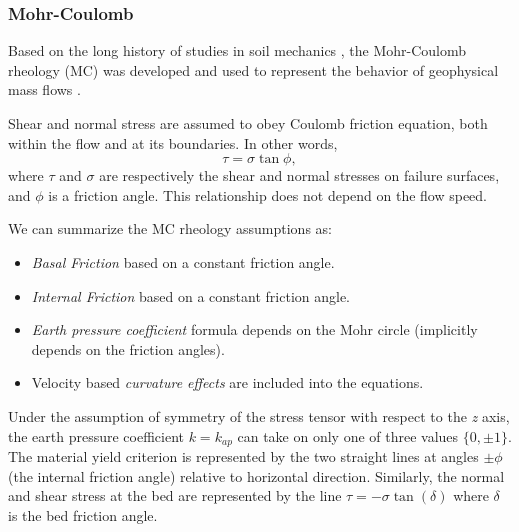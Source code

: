 \documentclass{article}
\begin{document}
\subsubsection{Mohr-Coulomb}\label{MCM}
Based on the long history of studies in soil mechanics \citep{Rankine1857,DruckerPage52}, the Mohr-Coulomb rheology (MC) was developed and used to represent the behavior of geophysical mass flows \citep{SavageHutter1989}.

Shear and normal stress are assumed to obey Coulomb friction equation, both within the flow and at its boundaries. In other words,
\begin{equation}
\tau = \sigma \tan \phi,
\end{equation}
where $\tau$ and $\sigma$ are respectively the shear and normal stresses on failure surfaces, and $\phi$ is a friction angle. This relationship does not depend on the flow speed.

We can summarize the MC rheology assumptions as:
\begin{itemize}
\item \textit{Basal Friction} based on a constant friction angle.

\item \textit{Internal Friction} based on a constant friction angle.

\item \textit{Earth pressure coefficient} formula depends on the Mohr circle (implicitly depends on the friction angles).

\item Velocity based \textit{curvature effects} are included into the equations.
\end{itemize}

Under the assumption of symmetry of the stress tensor with respect to the \textit{z} axis, the earth pressure coefficient $k=k_{ap}$ can take on only one of three values $\{ 0, \pm 1\}$. The material yield criterion is represented by the two straight lines at angles $\pm \phi$ (the internal friction angle) relative to horizontal direction. Similarly, the normal and shear stress at the bed are represented by the line $\tau=-\sigma \tan(\delta)$ where $\delta$ is the bed friction angle.
\end{document}
